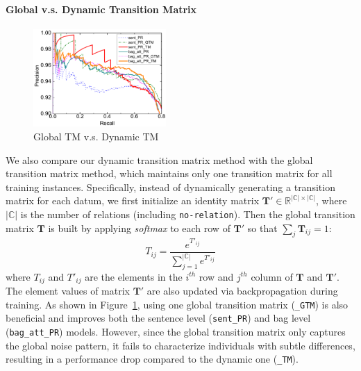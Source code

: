 \paragraph{Global v.s. Dynamic Transition Matrix}
\begin{figure}[t!]
\begin{center}
\includegraphics[width=0.45\textwidth]{figures/single_cmp_exp_overall.pdf}
\caption{Global TM v.s. Dynamic TM}
\label{fig: cmp_single_dynamic}
\end{center}
\end{figure}
We also compare our dynamic transition matrix method with the global transition matrix method,
which maintains only one transition matrix for all training instances. %
Specifically, instead of dynamically generating a transition matrix for each datum, we first initialize an identity matrix $\mathbf{T}'\in\mathbb{R}^{|\mathbb{C}|\times |\mathbb{C}|}$, where $|\mathbb{C}|$ is the number of relations (including \texttt{no-relation}).
Then the global transition matrix $\mathbf{T}$ is built by applying \emph{softmax} to each row of $\mathbf{T}'$ so that $\sum_j{\mathbf{T}_{ij}}=1$:
\begin{equation}
\label{shared_mat}
T_{ij} = \frac{e^{T'_{ij}}}{\sum_{j=1}^{|\mathbb{C}|}{e^{T'_{ij}}}}
\end{equation}
where $T_{ij}$ and $T'_{ij}$ are the elements in the $i^{th}$ row and $j^{th}$ column of $\mathbf{T}$ and $\mathbf{T}'$. The element values of matrix $\mathbf{T}'$ are also updated via backpropagation during training.
As shown in Figure~\ref{fig: cmp_single_dynamic},
using one global transition matrix (\texttt{\_GTM}) is also beneficial and improves both the sentence level (\texttt{sent\_PR}) and bag level  (\texttt{bag\_att\_PR}) models. However, since the global transition matrix only 
captures the global noise pattern, it fails to characterize individuals with subtle differences, 
resulting in a performance drop compared to the dynamic one (\texttt{\_TM}).


